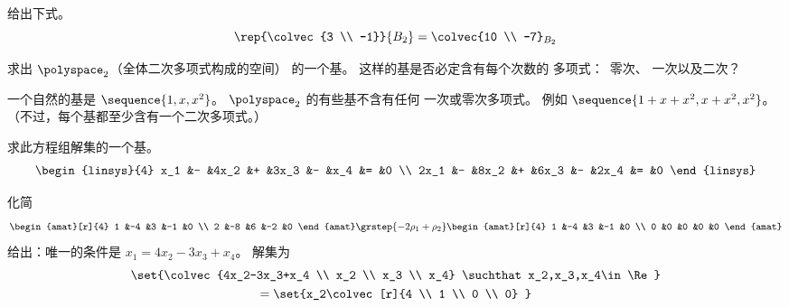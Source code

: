 \begin{exercises}
\begin{answer}
\begin{equation*}
      \end{equation*}
      给出下式。
      \begin{equation*}
        \rep{\colvec{3 \\ -1}}{B_2}
           =\colvec{10 \\ -7}_{B_2}
      \end{equation*}
    \end{answer}
  \item
    求出 \(  \polyspace_2 \)（全体二次多项式构成的空间）
    的一个基。
    这样的基是否必定含有每个次数的
    多项式：~零次、
    一次以及二次？
    \begin{answer}
      一个自然的基是 \( \sequence{1,x,x^2} \)。
      $\polyspace_2$ 的有些基不含有任何
      一次或零次多项式。
      例如 \( \sequence{1+x+x^2,x+x^2,x^2} \)。
      （不过，每个基都至少含有一个二次多项式。）
    \end{answer}
  \item
    求此方程组解集的一个基。
    \begin{equation*}
      \begin{linsys}{4}
         x_1  &-  &4x_2  &+  &3x_3  &-  &x_4  &=  &0  \\
        2x_1  &-  &8x_2  &+  &6x_3  &-  &2x_4 &=  &0
      \end{linsys}
    \end{equation*}
    \begin{answer}
      化简
      \begin{equation*}
        \begin{amat}[r]{4}
          1  &-4  &3  &-1  &0  \\
          2  &-8  &6  &-2  &0
        \end{amat}
        \grstep{-2\rho_1+\rho_2}
        \begin{amat}[r]{4}
          1  &-4  &3  &-1  &0  \\
          0  &0   &0  &0   &0
        \end{amat}
      \end{equation*}
      给出：唯一的条件是
      $x_1=4x_2-3x_3+x_4$。
      解集为
      \begin{multline*}
        \set{\colvec{4x_2-3x_3+x_4 \\ x_2 \\ x_3 \\ x_4}
               \suchthat x_2,x_3,x_4\in\Re}                          \\
        =\set{x_2\colvec[r]{4 \\ 1 \\ 0 \\ 0}
}
\end{multline*}
\end{answer}
\end{exercises}
